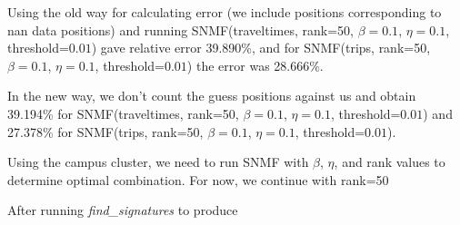 \documentclass[12pt,letterpaper]{article}
\begin{document}
Using the old way for calculating error (we include positions corresponding to nan data positions) and running SNMF(traveltimes, rank=50, $\beta=0.1$, $\eta=0.1$, threshold=$0.01$) gave relative error 39.890\%, and for SNMF(trips, rank=50, $\beta=0.1$, $\eta=0.1$, threshold=$0.01$) the error was 28.666\%. 

In the new way, we don't count the guess positions against us and obtain 39.194\% for SNMF(traveltimes, rank=50, $\beta=0.1$, $\eta=0.1$, threshold=$0.01$) and 27.378\% for SNMF(trips, rank=50, $\beta=0.1$, $\eta=0.1$, threshold=$0.01$). 

{\Huge Using the campus cluster, we need to run SNMF with $\beta$, $\eta$, and rank values to determine optimal combination. For now, we continue with rank=50}

After running \textsl{find\_signatures} to produce 
\end{document}
